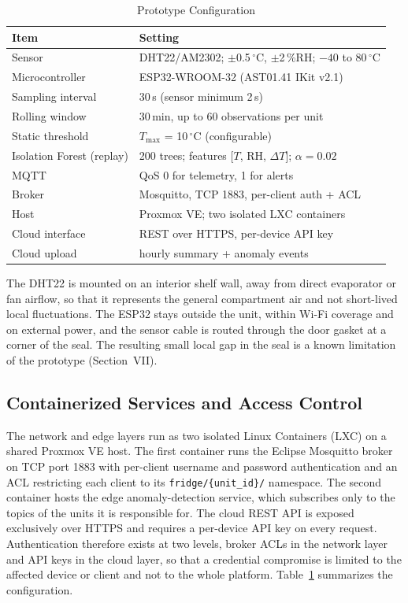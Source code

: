 \documentclass[conference]{IEEEtran}
\newcommand{\degC}{\ensuremath{^{\circ}}C}
\newcommand{\Tmax}{\ensuremath{T_{\max}}}
\begin{document}
\begin{table}[t]
\caption{Prototype Configuration}
\label{tab:config}
\centering
\footnotesize
\begin{tabular}{p{}p{}}
\toprule
Item & Setting \\
\midrule
Sensor & DHT22/AM2302; $\pm$0.5\,\degC, $\pm$2\,\%RH; $-40$ to 80\,\degC \\
Microcontroller & ESP32-WROOM-32 (AST01.41 IKit v2.1) \\
Sampling interval & 30\,s (sensor minimum 2\,s) \\
Rolling window & 30\,min, up to 60 observations per unit \\
Static threshold & \Tmax{} = 10\,\degC{} (configurable) \\
Isolation Forest (replay) & 200 trees; features [$T$, RH, $\Delta T$]; $\alpha = 0.02$ \\
MQTT & QoS 0 for telemetry, 1 for alerts \\
Broker & Mosquitto, TCP 1883, per-client auth + ACL \\
Host & Proxmox VE; two isolated LXC containers \\
Cloud interface & REST over HTTPS, per-device API key \\
Cloud upload & hourly summary + anomaly events \\
\bottomrule
\end{tabular}
\end{table}

The DHT22 is mounted on an interior shelf wall, away from direct evaporator or fan airflow, so that it represents the general compartment air and not short-lived local fluctuations. The ESP32 stays outside the unit, within Wi-Fi coverage and on external power, and the sensor cable is routed through the door gasket at a corner of the seal. The resulting small local gap in the seal is a known limitation of the prototype (Section~VII).

\subsection{Containerized Services and Access Control}
The network and edge layers run as two isolated Linux Containers (LXC) on a shared Proxmox VE host. The first container runs the Eclipse Mosquitto broker on TCP port 1883 with per-client username and password authentication and an ACL restricting each client to its \texttt{fridge/\{unit\_id\}/} namespace. The second container hosts the edge anomaly-detection service, which subscribes only to the topics of the units it is responsible for. The cloud REST API is exposed exclusively over HTTPS and requires a per-device API key on every request. Authentication therefore exists at two levels, broker ACLs in the network layer and API keys in the cloud layer, so that a credential compromise is limited to the affected device or client and not to the whole platform. Table~\ref{tab:config} summarizes the configuration.
\end{document}
